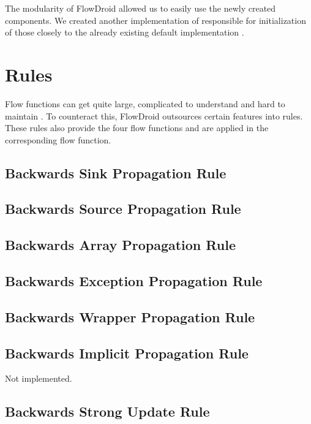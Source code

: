 \documentclass[../draft.tex]{subfiles}
\begin{document}
    The modularity of FlowDroid allowed us to easily use the newly created components. We created another implementation of  responsible for initialization of those closely to the already existing default implementation .

    \section{Rules}
    Flow functions can get quite large, complicated to understand and hard to maintain \cite{Lerch2015}. To counteract this, FlowDroid outsources certain features into rules. These rules also provide the four flow functions and are applied in the corresponding flow function.

    \subsection{Backwards Sink Propagation Rule}


    \subsection{Backwards Source Propagation Rule}\label{s:sourcerule}

    \subsection{Backwards Array Propagation Rule}

    \subsection{Backwards Exception Propagation Rule}

    \subsection{Backwards Wrapper Propagation Rule}

    \subsection{Backwards Implicit Propagation Rule}
    Not implemented.

    \subsection{Backwards Strong Update Rule}
\end{document}
